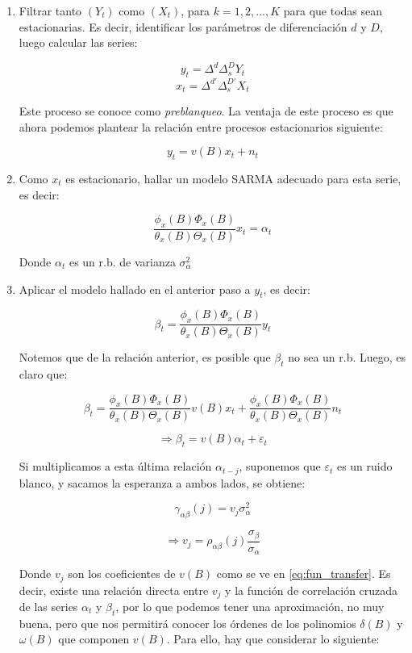 \documentclass[12pt,oneside]{book}\usepackage[]{graphicx}\usepackage[]{color}
\theoremstyle{definition} %
\begin{document}
\begin{enumerate}
\item Filtrar tanto $(Y_t)$ como $(X_t)$, para $k=1,2,...,K$ para que todas sean estacionarias. Es decir, identificar los parámetros de diferenciación $d$ y $D$, luego calcular las series: 


$$y_t=\Delta^d \Delta_s^D Y_t $$
$$x_t=\Delta^{d'} \Delta_s^{D'} X_t $$

Este proceso se conoce como \textit{preblanqueo}. La ventaja de este proceso es que ahora podemos plantear la relación entre procesos estacionarios siguiente:


\begin{equation}\label{eq:transf_y}
y_t = v(B)x_t + n_t
\end{equation}


\item Como $x_t$ es estacionario, hallar un modelo SARMA adecuado para esta serie, es decir:

$$\frac{ \phi_x(B) \Phi_x(B) }{\theta_x(B) \Theta_x(B)} x_t= \alpha_t $$

Donde $\alpha_t$ es un r.b. de varianza $\sigma_{\alpha}^2$


\item Aplicar el modelo hallado en el anterior paso a $y_t$, es decir:

$$\beta_t = \frac{ \phi_x(B) \Phi_x(B)}{\theta_x(B) \Theta_x(B)} y_t$$

Notemos que de la relación anterior, es posible que $\beta_t$ no sea un r.b. Luego, es claro que:

$$\beta_t = \frac{ \phi_x(B) \Phi_x(B)}{\theta_x(B) \Theta_x(B)} v(B) x_t + \frac{ \phi_x(B) \Phi_x(B)}{\theta_x(B) \Theta_x(B)} n_t $$

\begin{equation}\label{eq:transf_bet}
\Longrightarrow  \beta_t = v(B) \alpha_t + \varepsilon_t
\end{equation}

Si multiplicamos a esta última relación $\alpha_{t-j}$, suponemos que $\varepsilon_t$ es un ruido blanco, y sacamos la esperanza a ambos lados, se obtiene:

$$\gamma_{\alpha\beta}(j) = v_j \sigma_\alpha^2$$

$$\Longrightarrow  v_j = \rho_{\alpha\beta}(j)\frac{\sigma_\beta}{\sigma_\alpha}$$

Donde $v_j$ son los coeficientes de $v(B)$ como se ve en \ref{eq:fun_transfer}. Es decir, existe una relación directa entre $v_j$ y la función de correlación cruzada de las series $\alpha_t$ y $\beta_t$, por lo que podemos tener una aproximación, no muy buena, pero que nos permitirá conocer los órdenes de los polinomios $\delta(B)$ y $\omega(B)$ que componen $v(B)$. Para ello, hay que considerar lo siguiente: 


\end{enumerate}
\end{document}
